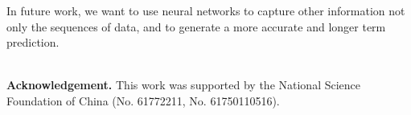\documentclass[runningheads]{llncs}
\begin{document}
In future work, we want to use neural networks to capture other information not only the sequences of data, and to generate a more accurate and longer term prediction.

~\\
\textbf{Acknowledgement.} This work was supported by the National Science Foundation of China (No. 61772211, No. 61750110516).

%
%
%
% 
% 
%


\end{document}
